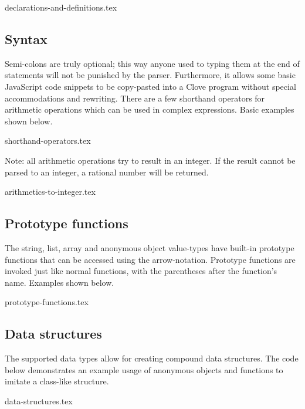 \documentclass[12pt,a4paper]{article}
\begin{document}
{declarations-and-definitions.tex}





\vspace{-1.75em}
\subsection*{Syntax}
Semi-colons are truly optional; this way anyone used to typing them at the end of statements will not be punished by the parser. Furthermore, it allows some basic JavaScript code snippets to be copy-pasted into a Clove program without special accommodations and rewriting. There are a few shorthand operators for arithmetic operations which can be used in complex expressions. Basic examples shown below.\par

{shorthand-operators.tex}

\vspace{-1em}
\noindent Note: all arithmetic operations try to result in an integer. If the result cannot be parsed to an integer, a rational number will be returned.

{arithmetics-to-integer.tex}





\subsection*{Prototype functions}
The string, list, array and anonymous object value-types have built-in prototype functions that can be accessed using the arrow-notation. Prototype functions are invoked just like normal functions, with the parentheses after the function's name. Examples shown below.

{prototype-functions.tex}





\vspace{-1.75em}
\subsection*{Data structures}
The supported data types allow for creating compound data structures. The code below demonstrates an example usage of anonymous objects and functions to imitate a class-like structure.

{data-structures.tex}
\end{document}
